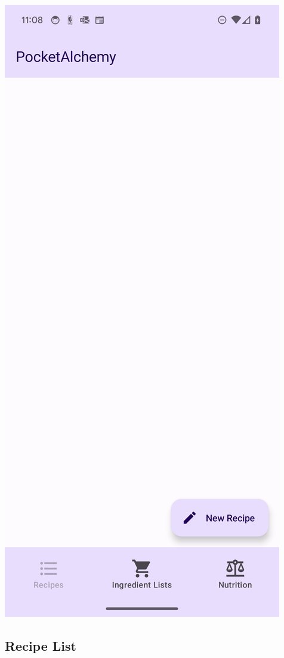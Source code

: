 \documentclass[12pt]{article}
\begin{document}
\begin{center}
\includegraphics[scale=0.175]{../res/img/EmptyListLight.png}
\end{center}

\subsection{Recipe List}
\end{document}
